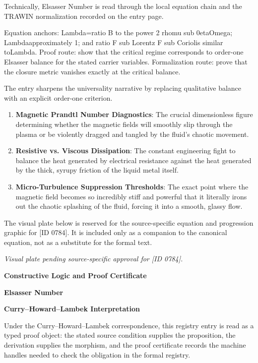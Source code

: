 Technically, Elsasser Number is read through the local equation chain and the TRAWIN normalization recorded on the entry page.

Equation anchors: Lambda=ratio B to the power 2 rhomu sub 0etaOmega; Lambdaapproximately 1; and ratio F sub Lorentz F sub Coriolis similar toLambda. Proof route: show that the critical regime corresponds to order-one Elsasser balance for the stated carrier variables. Formalization route: prove that the closure metric vanishes exactly at the critical balance.

The entry sharpens the universality narrative by replacing qualitative balance with an explicit order-one criterion.
\endgroup

\begin{enumerate}[leftmargin=1.6em,itemsep=6pt,topsep=4pt]
\item \textbf{Magnetic Prandtl Number Diagnostics}: The crucial dimensionless figure determining whether the magnetic fields will smoothly slip through the plasma or be violently dragged and tangled by the fluid's chaotic movement.
\item \textbf{Resistive vs. Viscous Dissipation}: The constant engineering fight to balance the heat generated by electrical resistance against the heat generated by the thick, syrupy friction of the liquid metal itself.
\item \textbf{Micro-Turbulence Suppression Thresholds}: The exact point where the magnetic field becomes so incredibly stiff and powerful that it literally irons out the chaotic splashing of the fluid, forcing it into a smooth, glassy flow.
\end{enumerate}

\begingroup\footnotesize\sloppy
The visual plate below is reserved for the source-specific equation and progression graphic for [ID 0784]. It is included only as a companion to the canonical equation, not as a substitute for the formal text.
\par\endgroup
\begingroup\footnotesize\itshape
Visual plate pending source-specific approval for [ID 0784].
\par\endgroup

\clearpage
\begingroup\tzpsupportsetup
\noindent\textbf{\fontsize{10.8pt}{12.8pt}\selectfont [ID 0784] Constructive Logic and Proof Certificate}\par
\noindent\textbf{\fontsize{10pt}{12pt}\selectfont Elsasser Number}\par
\vspace{0.45em}
\begingroup
\footnotesize
\setlength{\parskip}{0.22em}
\setlength{\parindent}{0pt}
\noindent\textbf{Curry--Howard--Lambek Interpretation}\par
Under the Curry--Howard--Lambek correspondence, this registry entry is read as a typed proof
object: the stated source condition supplies the proposition, the derivation supplies the
morphism, and the proof certificate records the machine handles needed to check the obligation
in the formal registry.

